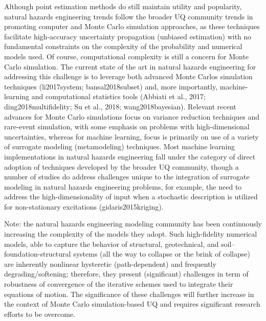 Although point estimation methods do still maintain utility and popularity, natural hazards engineering trends follow the broader UQ community trends in promoting computer and Monte Carlo simulation approaches, as these techniques facilitate high-accuracy uncertainty propagation (unbiased estimation) with no fundamental constraints on the complexity of the probability and numerical models used. Of course, computational complexity is still a concern for Monte Carlo simulation. The current state of the art in natural hazards engineering for addressing this challenge is to leverage both advanced Monte Carlos simulation techniques (li2017system; bansal2018subset) and, more importantly, machine-learning and computational statistics tools (Abbiati et al., 2017; ding2018multifidelity; Su et al., 2018; wang2018bayesian). Relevant recent advances for Monte Carlo simulations focus on variance reduction techniques and rare-event simulation, with some emphasis on problems with high-dimensional uncertainties, whereas for machine learning, focus is primarily on use of a variety of surrogate modeling (metamodeling) techniques. Most machine learning implementations in natural hazards engineering fall under the category of direct adoption of techniques developed by the broader UQ community, though a number of studies do address challenges unique to the integration of surrogate modeling in natural hazards engineering problems, for example, the need to address the high-dimensionality of input when a stochastic description is utilized for non-stationary excitations (gidaris2015kriging).

Note: the natural hazards engineering modeling community has been continuously increasing the complexity of the models they adopt. Such high-fidelity numerical models, able to capture the behavior of structural, geotechnical, and soil–foundation-structural systems (all the way to collapse or the brink of collapse) are inherently nonlinear hysteretic (path-dependent) and frequently degrading/softening; therefore, they present (significant) challenges in term of robustness of convergence of the iterative schemes used to integrate their equations of motion. The significance of these challenges will further increase in the context of Monte Carlo simulation-based UQ and requires significant research efforts to be overcome.

